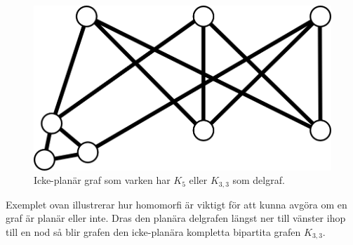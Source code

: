 \documentclass[a4paper,11pt]{article}
\begin{document}
\begin{figure}[!ht]
	\begin{center}
		\includegraphics{fig9}
		\caption{Icke-planär graf som varken har $K_5$ eller $K_{3,3}$ som delgraf.}
		\label{fig9}
	\end{center}
\end{figure}
\FloatBarrier

Exemplet ovan illustrerar hur homomorfi är viktigt för att kunna avgöra om en graf är planär eller inte. Dras den planära delgrafen längst ner till vänster ihop till en nod så blir grafen den icke-planära kompletta bipartita grafen $K_{3,3}$.
\end{document}
